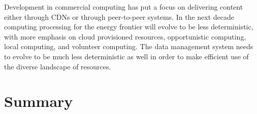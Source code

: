 Development in commercial computing has put a focus on delivering content either through CDNs or through peer-to-peer systems.    In the next decade computing processing for the energy frontier will evolve to be less deterministic, with more emphasis on cloud provisioned resources, opportunistic computing, local computing, and volunteer computing.    The data management system needs to evolve to be much less deterministic as well in order to make efficient use of the diverse landscape of resources. 


\section{Summary}
\label{sec:comp-summary}




